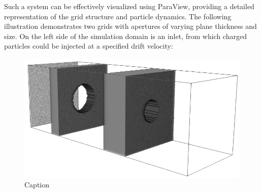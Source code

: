 Such a system can be effectively visualized using ParaView, providing a detailed representation of the grid structure and particle dynamics. The following illustration demonstrates two grids with apertures of varying plane thickness and size. On the left side of the simulation domain is an inlet, from which charged particles could be injected at a specified drift velocity:
\begin{figure}[H]
    \centering
    \includegraphics[width=0.7\linewidth]{figures/GIT_Paraview.png}
    \caption{Caption}
    \label{fig:enter-label}
\end{figure}